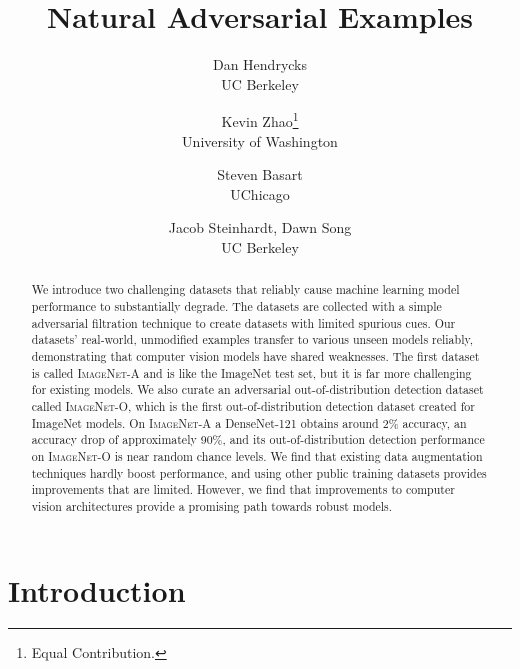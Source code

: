\documentclass[10pt,twocolumn,letterpaper]{article}
\begin{document}
\makeatletter
\newcommand{\printfnsymbol}[1]{\textsuperscript{\@fnsymbol{#1}}}
\makeatother

\title{Natural Adversarial Examples}

\author{Dan Hendrycks\\
UC Berkeley\\
\and
Kevin Zhao\thanks{Equal Contribution.}\\
University of Washington\\
\and
Steven Basart\printfnsymbol{1}\\
UChicago\\
\and
Jacob Steinhardt, Dawn Song\\
UC Berkeley\\
}

\maketitle


\begin{abstract}
We introduce two challenging datasets that reliably cause machine learning model performance to substantially degrade.
The datasets are collected with a simple adversarial filtration technique to create datasets with limited spurious cues.
Our datasets' real-world, unmodified examples transfer to various unseen models reliably, demonstrating that computer vision models have shared weaknesses.
The first dataset is called \textsc{ImageNet-A} and is like the ImageNet test set, but it is far more challenging for existing models. We also curate an adversarial out-of-distribution detection dataset called \textsc{ImageNet-O}, which is the first out-of-distribution detection dataset created for ImageNet models. On \textsc{ImageNet-A} a DenseNet-121 obtains around 2\% accuracy, an accuracy drop of approximately 90\%, and its out-of-distribution detection performance on \textsc{ImageNet-O} is near random chance levels. We find that existing data augmentation techniques hardly boost performance, and using other public training datasets provides improvements that are limited. However, we find that improvements to computer vision architectures provide a promising path towards robust models.
\end{abstract} 
\section{Introduction}
\end{document}
